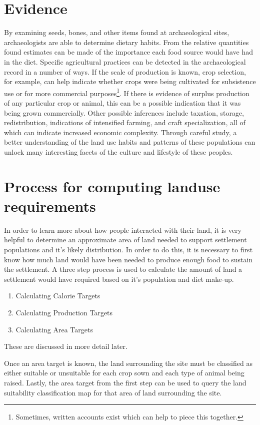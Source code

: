 \section{Evidence} \label{sec:Evidence} By examining seeds, bones, and other
items found at archaeological sites, archaeologists are able to determine 
dietary habits. From the relative quantities found estimates can be made of the
importance each food source would have had in the diet.  Specific agricultural practices
can be detected in the archaeological record in a number of ways.  If the scale
of production is known, crop selection, for example, can help indicate whether
crops were being cultivated for subsistence use or for more commercial
purposes\footnote{Sometimes, written accounts exist which can help to
piece this together.}.  If there is evidence of surplus production of any
particular crop or animal, this can be a possible indication that it was being
grown commercially.  Other possible inferences include taxation, storage,
redistribution, indications of intensified farming, and craft specialization,
all of which can indicate increased economic complexity.  Through careful
study, a better understanding of the land use habits and patterns of these
populations can unlock many interesting facets of the culture and lifestyle of
these peoples.

\section{Process for computing landuse requirements} \label{sec:EarlyAttempts} 

In order to learn more about how people interacted with their land, it is very
helpful to determine an approximate area of land needed to support settlement
populations and it's likely distribution.  In order to do this, it is necessary
to first know how much land would have been needed to produce enough food to
sustain the settlement.  A three step process is used to calculate the amount of
land a settlement would have required based on it's population and diet
make-up.  

\begin{enumerate}
 \item Calculating Calorie Targets
 \item Calculating Production Targets
 \item Calculating Area Targets
\end{enumerate}
These are discussed in more detail later.

Once an area target is known, the land surrounding the
site must be classified as either suitable or unsuitable for each crop sown and
each type of animal being raised.  Lastly, the area target from the first step
can be used to query the land suitability classification map for that area of
land surrounding the site.


